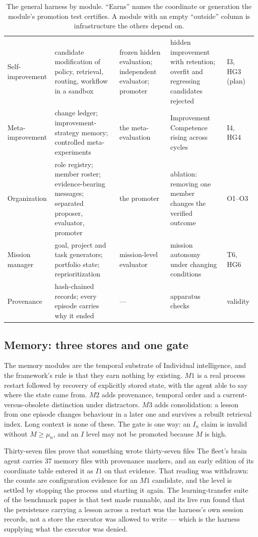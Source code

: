 \begin{table}[!htbp]
\begin{tabularx}{\textwidth}{@{}lYYYl@{}}
Self-improvement & candidate modification of policy, retrieval, routing, workflow in a sandbox & frozen hidden evaluation; independent evaluator; promoter & hidden improvement with retention; overfit and regressing candidates rejected & I3, HG3 (plan) \\
Meta-improvement & change ledger; improvement-strategy memory; controlled meta-experiments & the meta-evaluation & Improvement Competence rising across cycles & I4, HG4 \\
Organization & role registry; member roster; evidence-bearing messages; separated proposer, evaluator, promoter & the promoter & ablation: removing one member changes the verified outcome & O1--O3 \\
Mission manager & goal, project and task generators; portfolio state; reprioritization & mission-level evaluator & mission autonomy under changing conditions & T6, HG6 \\
Provenance & hash-chained records; every episode carries why it ended & --- & apparatus checks & validity \\
\bottomrule
\end{tabularx}
\caption{The general harness by module. ``Earns'' names the coordinate or generation the module's promotion test certifies. A module with an empty ``outside'' column is infrastructure the others depend on.}
\label{tab:modules}
\end{table}

\subsection{Memory: three stores and one gate}

The memory modules are the temporal substrate of Individual intelligence, and the framework's rule is that they earn nothing by existing. $M1$ is a real process restart followed by recovery of explicitly stored state, with the agent able to say where the state came from. $M2$ adds provenance, temporal order and a current-versus-obsolete distinction under distractors. $M3$ adds consolidation: a lesson from one episode changes behaviour in a later one and survives a rebuilt retrieval index. Long context is none of these. The gate is one way: an $I_n$ claim is invalid without $M \ge \mu_n$, and an $I$ level may not be promoted because $M$ is high.

\begin{cautionbox}{Thirty-seven files prove that something wrote thirty-seven files}
The fleet's brain agent carries 37 memory files with provenance markers, and an early edition of its coordinate table entered it as $I1$ on that evidence. That reading was withdrawn: the counts are configuration evidence for an $M1$ candidate, and the level is settled by stopping the process and starting it again. The learning-transfer suite of the benchmark paper is that test made runnable, and its live run found that the persistence carrying a lesson across a restart was the harness's own session records, not a store the executor was allowed to write --- which is the harness supplying what the executor was denied.
\end{cautionbox}


